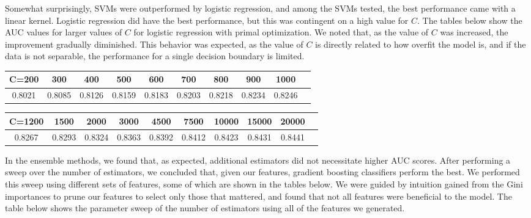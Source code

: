 \documentclass{article} %
\begin{document}
Somewhat surprisingly, SVMs were outperformed by logistic regression, and among
the SVMs tested, the best performance came with a linear kernel. Logistic
regression did have the best performance, but this was contingent on a high
value for $C$. The tables below show the AUC values for larger values of $C$ for
logistic regression with primal optimization. We noted that, as the value of $C$
was increased, the improvement gradually diminished. This behavior was expected,
as the value of $C$ is directly related to how overfit the model is, and if the
data is not separable, the performance for a single decision boundary is
limited.

\begin{adjustbox}{width=\textwidth,totalheight=\textheight,keepaspectratio}
\begin{tabular}{cccccccccc}
C=200 & 300 & 400 & 500 & 600 & 700 & 800 & 900 & 1000 \\
\hline
0.8021 & 0.8085 & 0.8126 & 0.8159 & 0.8183 & 0.8203 & 0.8218 & 0.8234 & 0.8246
\end{tabular}
\end{adjustbox}

\begin{adjustbox}{width=\textwidth,totalheight=\textheight,keepaspectratio}
\begin{tabular}{cccccccccc}
C=1200 & 1500 & 2000 & 3000 & 4500 & 7500 & 10000 & 15000 & 20000\\
\hline
 0.8267 & 0.8293 & 0.8324 & 0.8363 & 0.8392 & 0.8412 & 0.8423 & 0.8431 & 0.8441
\end{tabular}
\end{adjustbox}

In the ensemble methods, we found that, as expected, additional estimators did
not necessitate higher AUC scores. After performing a sweep over the number of
estimators, we concluded that, given our features, gradient boosting classifiers
perform the best. We performed this sweep using different sets of features, some
of which are shown in the tables below. We were guided by intuition gained from the Gini
importances to prune our features to select only those that mattered, and found
that not all features were beneficial to the model. The table below shows the
parameter sweep of the number of estimators using
all of the features we generated.
\end{document}
